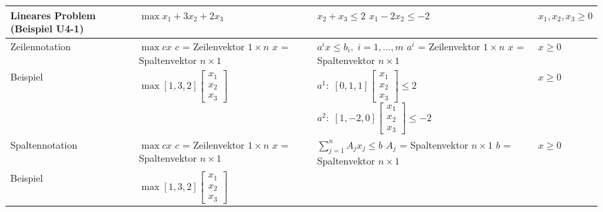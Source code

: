     \begin{tabularx}{\textwidth}{|X|p{4.5cm}|p{5.5cm}|p{2cm}|}
    \hline
      Lineares Problem (Beispiel U4-1)
        & $\max x_1 + 3 x_2 + 2x_3$
        & $x_2 + x_3 \leq 2$ \newline 
          $x_1 - 2x_2 \leq -2$
        & $x_1, x_2, x_3 \geq 0$\\
      \hline
      \hline
      Zeilennotation
        & $\max c x$ \newline
        $c$ = Zeilenvektor $1 \times n$\newline
        $x$ = Spaltenvektor $n \times 1$
        & $a^i x \leq b_i, \;i=1,...,m$ \newline
        $a^i$ = Zeilenvektor $1 \times n$\newline
        $x$ = Spaltenvektor $n \times 1$
        & $x \geq 0$\\
      Beispiel
        & $\max [1, 3, 2]
          \begin{bmatrix}
            x_1\\x_2\\x_3
          \end{bmatrix}$
        & $a^1: \; [0,1,1]
          \begin{bmatrix}
            x_1\\x_2\\x_3
          \end{bmatrix} \leq 2$\newline
          $a^2: \; [1,-2,0]
          \begin{bmatrix}
            x_1\\x_2\\x_3
          \end{bmatrix} \leq -2$
        & $x \geq 0$
        \\
      \hline
      Spaltennotation
        & $\max c x$ \newline
        $c$ = Zeilenvektor $1 \times n$\newline
        $x$ = Spaltenvektor $n \times 1$
        & $\sum\limits_{j=1}^{n}A_j x_j \leq b$ \newline
        $A_j$ = Spaltenvektor $n \times 1$ \newline 
        $b$ = Spaltenvektor $n \times 1$
        & $x \geq 0$
        \\
      Beispiel
        & $\max [1,3,2]
          \begin{bmatrix}
            x_1\\x_2\\x_3
          \end{bmatrix}$

\end{tabularx}
